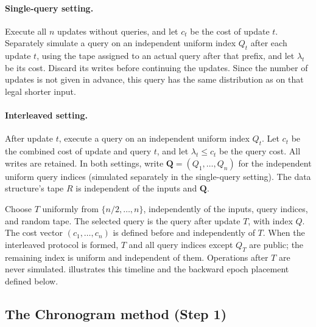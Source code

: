 \documentclass[11pt]{article}
\theoremstyle{plain}
\begin{document}
\paragraph{Single-query setting.}
Execute all $n$ updates without queries, and let $c_t$ be the cost of
update $t$. Separately simulate a query on an independent uniform index
$Q_t$ after each update $t$, using the tape assigned to an actual query
after that prefix, and let $\lambda_t$ be its cost. Discard its writes
before continuing the updates. Since the number of updates is not given
in advance, this query has the same distribution as on that legal
shorter input.

\paragraph{Interleaved setting.}
After update $t$, execute a query on an independent uniform index $Q_t$.
Let $c_t$ be the combined cost of update and query $t$, and let
$\lambda_t\le c_t$ be the query cost. All writes are retained.
In both settings, write $\mathbf Q=(Q_1,\ldots,Q_n)$ for the
independent uniform query indices (simulated separately in the single-query setting).
The data structure's tape $R$ is independent of the inputs and $\mathbf Q$.

Choose $T$ uniformly from $\{n/2,\ldots,n\}$, independently
of the inputs, query indices, and random tape. The selected query is the query after update $T$,
with index $Q$. The cost vector $(c_1,\ldots,c_n)$ is defined before and
independently of $T$. When the interleaved protocol is formed, $T$ and all
query indices except $Q_T$ are public; the remaining index is uniform
and independent of them. Operations after $T$ are never simulated.
 illustrates this timeline and the backward epoch
placement defined below.

\subsection{The Chronogram method (Step 1)}\label{sec:outer}
\end{document}
